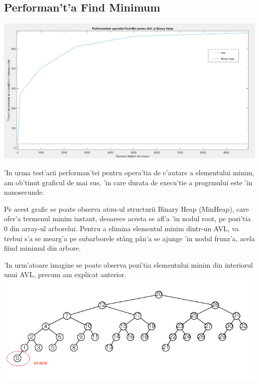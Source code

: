 \documentclass[titlepage,12pt]{article}
\numberwithin{figure}{section}
\begin{document}
\subsection{Performan't'a Find Minimum}
\includegraphics[scale=0.5]{FMin}
\\ \par 'In urma test'arii performan'tei pentru opera'tia de c'autare a elementului minim, am ob'tinut graficul de mai sus, 'in care durata de execu'tie a progrmului este 'in nanosecunde. 
\par Pe acest grafic se poate observa atuu-ul structurii Binary Heap (MinHeap), care ofer'a termenul minim instant, deoarece acesta se afl'a 'in nodul root, pe pozi'tia 0 din array-ul arborelui. Pentru a elimina elementul minim dintr-un AVL, va trebui s'a se mearg'a pe subarborele st\^ang p\^an'a se ajunge 'in nodul frunz'a, acela fiind minimul din arbore.
\par 'In urm'atoare imagine se poate observa pozi'tia elementului minim din interiorul unui AVL, precum am explicat anterior.
\\
\includegraphics[scale=1]{Min}
\end{document}
